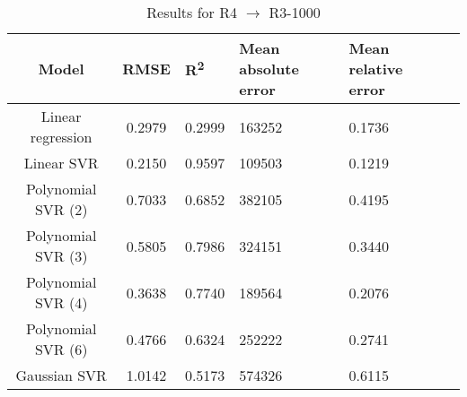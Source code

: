\begin{table}[H]
\centering
\begin{adjustbox}{center}
\begin{tabular}{c | c M{1.2cm} M{2.5cm} M{2.5cm} M{1.8cm}}
Model & RMSE & R\textsuperscript{2} & Mean absolute error & Mean relative error \tabularnewline
\hline
Linear regression & 0.2979 & 0.2999 & 163252 & 0.1736 \\
Linear SVR & 0.2150 & 0.9597 & 109503 & 0.1219 \\
Polynomial SVR (2) & 0.7033 & 0.6852 & 382105 & 0.4195 \\
Polynomial SVR (3) & 0.5805 & 0.7986 & 324151 & 0.3440 \\
Polynomial SVR (4) & 0.3638 & 0.7740 & 189564 & 0.2076 \\
Polynomial SVR (6) & 0.4766 & 0.6324 & 252222 & 0.2741 \\
Gaussian SVR & 1.0142 & 0.5173 & 574326 & 0.6115 \\
\end{tabular}
\end{adjustbox}
\\
\caption{Results for R4 $\rightarrow$ R3-1000}
\label{tab:coreonly_linear_R4_R3_1000}
\end{table}
